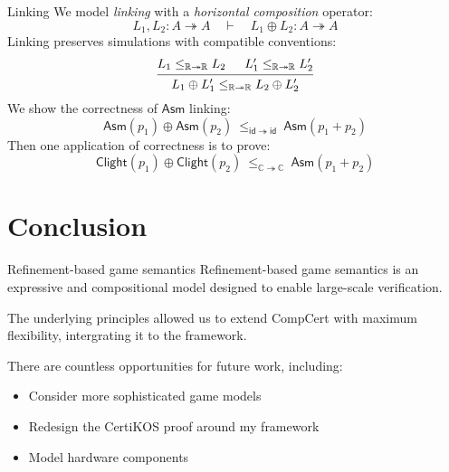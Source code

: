 \documentclass[aspectratio=141]{beamer}
\newcommand{\kw}[1]{\ensuremath{ \mathsf{#1} }}
\begin{document}
\begin{frame}{Linking} %
  We model \emph{linking} with a
  \emph{horizontal composition} operator:
  \[
    L_1, L_2 : A \twoheadrightarrow A
    \quad \vdash \quad
    L_1 \oplus L_2 : A \twoheadrightarrow A
  \]
  \pause
  Linking preserves simulations with compatible conventions:
  \[
    \begin{prooftree}
      \hypo{L_1 \le_{\mathbb{R} \twoheadrightarrow \mathbb{R}} L_2}
      \hypo{L_1' \le_{\mathbb{R} \twoheadrightarrow \mathbb{R}} L_2'}
      \infer2{L_1 \oplus L_1'
        \le_{\mathbb{R} \twoheadrightarrow \mathbb{R}}
        L_2 \oplus L_2'}
    \end{prooftree}
  \]
  \pause
  We show the correctness of $\kw{Asm}$ linking:
  \[
    \kw{Asm}(p_1) \oplus \kw{Asm}(p_2)
    \: \le_{\kw{id} \twoheadrightarrow \kw{id}} \:
    \kw{Asm}(p_1 + p_2)
  \]
  Then one application of correctness is to prove:
  \[
    \kw{Clight}(p_1) \oplus \kw{Clight}(p_2)
    \: \le_{\mathbb{C} \twoheadrightarrow \mathbb{C}} \:
    \kw{Asm}(p_1 + p_2)
  \]
\end{frame}


\section{Conclusion} %

\begin{frame}{Refinement-based game semantics}
  Refinement-based game semantics
  is an expressive and compositional model
  designed to enable large-scale verification.

  The underlying principles allowed us to
  extend CompCert with maximum flexibility,
  intergrating it to the framework.

  There are countless opportunities for future work,
  including:
  \begin{itemize}
    \item Consider more sophisticated game models
    \item Redesign the CertiKOS proof around my framework
    \item Model hardware components
  \end{itemize}
\end{frame}
\end{document}
